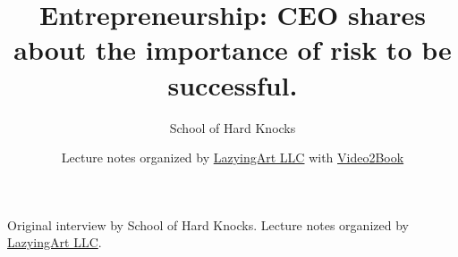 \documentclass[11pt,oneside]{book}
\begin{document}
\frontmatter
\title{Entrepreneurship: CEO shares about the importance of risk to be successful.}
\author{School of Hard Knocks}
\date{Lecture notes organized by \href{https://lazying.art}{LazyingArt LLC} with \href{https://github.com/lachlanchen/Video2Book}{Video2Book}}
\maketitle
\begin{center}
\small Original interview by School of Hard Knocks. Lecture notes organized by \href{https://lazying.art}{LazyingArt LLC}.
\end{center}
\clearpage
\mainmatter

\end{document}
